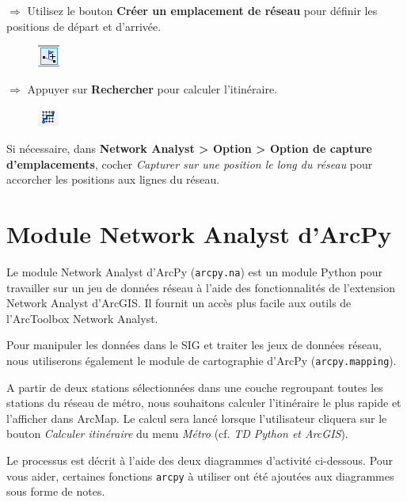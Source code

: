 \documentclass[11pt]{article}
\newcommand{\action}{$\Rightarrow$ }
\begin{document}
\action Utilisez le bouton \textbf{Créer un emplacement de réseau} pour définir les positions de départ et d'arrivée.
\begin{figure}[H]
	\center \includegraphics{img/td3b/na_creer_emplacement.png} \\
\end{figure}

\action Appuyer sur \textbf{Rechercher} pour calculer l'itinéraire.
\begin{figure}[H]
	\center \includegraphics{img/td3b/na_rechercher.png} \\
\end{figure}

Si nécessaire, dans \textbf{Network Analyst > Option > Option de capture d'emplacements}, cocher \textit{Capturer sur une position le long du réseau} pour accorcher les positions aux lignes du réseau.


\section{Module Network Analyst d'ArcPy}

Le module Network Analyst d'ArcPy (\texttt{arcpy.na}) est un module Python pour travailler sur un jeu de données réseau à l'aide des fonctionnalités de l'extension Network Analyst d'ArcGIS. Il fournit un accès plus facile aux outils de l'ArcToolbox Network Analyst.

Pour manipuler les données dans le SIG et traiter les jeux de données réseau, nous utiliserons également le module de cartographie d'ArcPy (\texttt{arcpy.mapping}).

A partir de deux stations sélectionnées dans une couche regroupant toutes les stations du réseau de métro, nous souhaitons calculer l'itinéraire le plus rapide et l'afficher dans ArcMap. Le calcul sera lancé lorsque l'utilisateur cliquera sur le bouton \textit{Calculer itinéraire} du menu \textit{Métro} (cf. \textit{TD Python et ArcGIS}).

Le processus est décrit à l'aide des deux diagrammes d'activité ci-dessous. Pour vous aider, certaines fonctions \texttt{arcpy} à utiliser ont été ajoutées aux diagrammes sous forme de notes.
\end{document}
